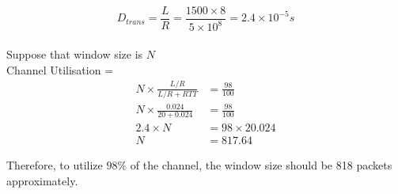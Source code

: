 \documentclass[11pt,a4paper]{article}
\begin{document}
$$ D_{trans} = \frac{L}{R} = \frac{1500 \times 8}{5 \times 10^8} = 2.4 \times 10^{-5} s$$ \\
Suppose that window size is $N$\\
Channel Utilisation = 
\begin{align*}
    N \times \frac{L/R}{ L/R + RTT } &= \frac{98}{100} \\
    N \times \frac{0.024}{20 + 0.024} &= \frac{98}{100} \\
    2.4 \times N &= 98 \times 20.024 \\
    N &= 817.64
\end{align*}

Therefore, to utilize $98\%$ of the channel, the window size should be 818 packets approximately.
\end{document}
